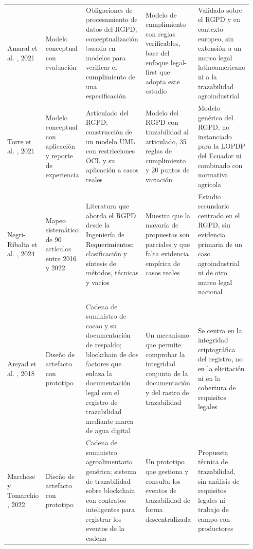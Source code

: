\documentclass[pdflatex,sn-mathphys-num]{sn-jnl}
\begin{document}
\begin{table}[htbp]
\begin{tabular}{@{}p{2.2cm}p{1.9cm}p{2.6cm}p{2.6cm}p{3.4cm}@{}}
\addlinespace
Amaral et al. \cite{amaral2021}, 2021 & Modelo conceptual con evaluaci\'on & Obligaciones de procesamiento de datos del RGPD; conceptualizaci\'on basada en modelos para verificar el cumplimiento de una especificaci\'on & Modelo de cumplimiento con reglas verificables, base del enfoque legal-first que adopta este estudio & Validado sobre el RGPD y en contexto europeo, sin extensi\'on a un marco legal latinoamericano ni a la trazabilidad agroindustrial \\
\addlinespace
Torre et al. \cite{torre2021}, 2021 & Modelo conceptual con aplicaci\'on y reporte de experiencia & Articulado del RGPD; construcci\'on de un modelo UML con restricciones OCL y su aplicaci\'on a casos reales & Modelo del RGPD con trazabilidad al articulado, 35 reglas de cumplimiento y 20 puntos de variaci\'on & Modelo gen\'erico del RGPD, no instanciado para la LOPDP del Ecuador ni combinado con normativa agr\'icola \\
\addlinespace
Negri-Ribalta et al. \cite{negriribalta2024}, 2024 & Mapeo sistem\'atico de 90 art\'iculos entre 2016 y 2022 & Literatura que aborda el RGPD desde la Ingenier\'ia de Requerimientos; clasificaci\'on y s\'intesis de m\'etodos, t\'ecnicas y vac\'ios & Muestra que la mayor\'ia de propuestas son parciales y que falta evidencia emp\'irica de casos reales & Estudio secundario centrado en el RGPD, sin evidencia primaria de un caso agroindustrial ni de otro marco legal nacional \\
\addlinespace
\multicolumn{5}{@{}l}{\textit{Bloque B. Trazabilidad agroalimentaria y de cacao}} \\
\addlinespace
Arsyad et al. \cite{arsyad2018}, 2018 & Dise\~no de artefacto con prototipo & Cadena de suministro de cacao y su documentaci\'on de respaldo; blockchain de dos factores que enlaza la documentaci\'on legal con el registro de trazabilidad mediante marca de agua digital & Un mecanismo que permite comprobar la integridad conjunta de la documentaci\'on y del rastro de trazabilidad & Se centra en la integridad criptogr\'afica del registro, no en la elicitaci\'on ni en la cobertura de requisitos legales \\
\addlinespace
Marchese y Tomarchio \cite{marchese2022}, 2022 & Dise\~no de artefacto con prototipo & Cadena de suministro agroalimentaria gen\'erica; sistema de trazabilidad sobre blockchain con contratos inteligentes para registrar los eventos de la cadena & Un prototipo que gestiona y consulta los eventos de trazabilidad de forma descentralizada & Propuesta t\'ecnica de trazabilidad, sin an\'alisis de requisitos legales ni trabajo de campo con productores \\

\end{tabular}
\end{table}
\end{document}
